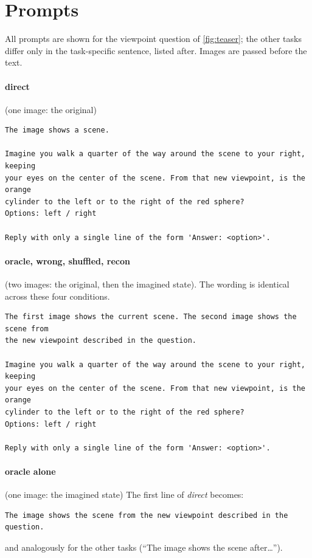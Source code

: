 \section{Prompts}
\label{sec:supp-prompts}
All prompts are shown for the viewpoint question of \cref{fig:teaser}; the other tasks differ only in the task-specific sentence, listed after. Images are passed before the text.

\paragraph{direct} (one image: the original)
\begingroup\footnotesize\begin{verbatim}
The image shows a scene.

Imagine you walk a quarter of the way around the scene to your right, keeping
your eyes on the center of the scene. From that new viewpoint, is the orange
cylinder to the left or to the right of the red sphere?
Options: left / right

Reply with only a single line of the form 'Answer: <option>'.
\end{verbatim}
\endgroup
\paragraph{oracle, wrong, shuffled, recon} (two images: the original, then the imagined state). The wording is identical across these four conditions.
\begingroup\footnotesize\begin{verbatim}
The first image shows the current scene. The second image shows the scene from
the new viewpoint described in the question.

Imagine you walk a quarter of the way around the scene to your right, keeping
your eyes on the center of the scene. From that new viewpoint, is the orange
cylinder to the left or to the right of the red sphere?
Options: left / right

Reply with only a single line of the form 'Answer: <option>'.
\end{verbatim}
\endgroup
\paragraph{oracle alone} (one image: the imagined state) The first line of \emph{direct} becomes:
\begingroup\footnotesize\begin{verbatim}
The image shows the scene from the new viewpoint described in the question.
\end{verbatim}
\endgroup
\noindent and analogously for the other tasks (``The image shows the scene after\ldots'').

